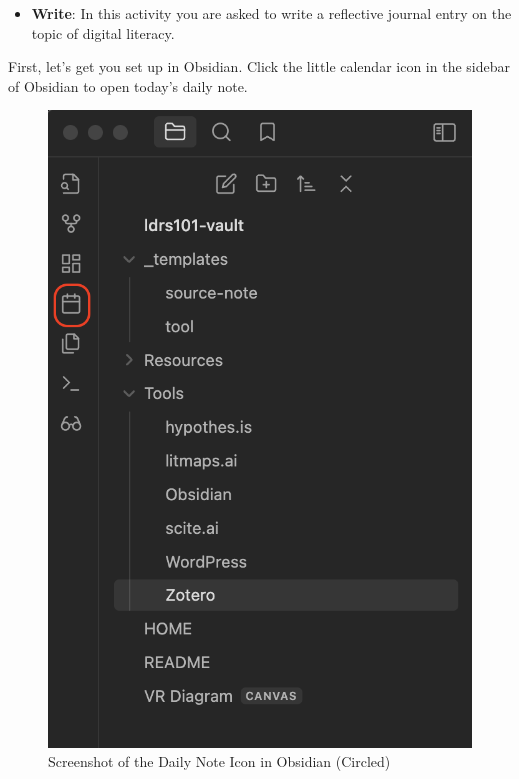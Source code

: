\documentclass[
  letterpaper,
  DIV=11,
  numbers=noendperiod]{scrreprt}
\providecommand{\tightlist}{%
  \setlength{\itemsep}{0pt}\setlength{\parskip}{0pt}}\usepackage{longtable,booktabs,array}
\begin{document}
\begin{tcolorbox}[enhanced jigsaw, toprule=.15mm, colback=white, colframe=quarto-callout-note-color-frame, bottomtitle=1mm, leftrule=.75mm, coltitle=black, titlerule=0mm, rightrule=.15mm, colbacktitle=quarto-callout-note-color!10!white, left=2mm, title={Learning Activity}, opacitybacktitle=0.6, opacityback=0, breakable, toptitle=1mm, arc=.35mm, bottomrule=.15mm]

\begin{itemize}
\tightlist
\item
  \textbf{Write}: In this activity you are asked to write a reflective
  journal entry on the topic of digital literacy.
\end{itemize}

First, let's get you set up in Obsidian. Click the little calendar icon
in the sidebar of Obsidian to open today's daily note.

\begin{figure}[H]

\caption{\label{fig-obsidian1}Screenshot of the Daily Note Icon in
Obsidian (Circled)}

\includegraphics{assets/u1/obsidian1.png}


\end{figure}
\end{tcolorbox}
\end{document}
